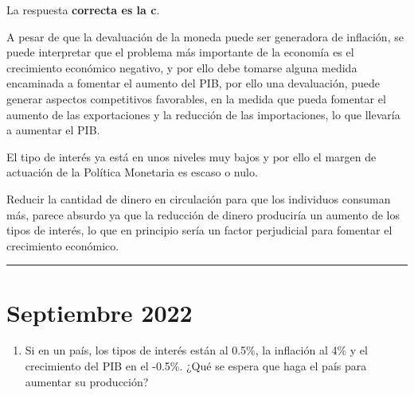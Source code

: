\documentclass[
  letterpaper,
  DIV=11,
  numbers=noendperiod]{scrreprt}
\providecommand{\tightlist}{%
  \setlength{\itemsep}{0pt}\setlength{\parskip}{0pt}}\usepackage{longtable,booktabs,array}
\begin{document}
\begin{tcolorbox}[enhanced jigsaw, left=2mm, opacityback=0, colback=white, breakable, arc=.35mm, bottomrule=.15mm, rightrule=.15mm, toprule=.15mm, leftrule=.75mm, colframe=quarto-callout-tip-color-frame]
\begin{minipage}[t]{5.5mm}
\textcolor{quarto-callout-tip-color}{\faLightbulb}
\end{minipage}%
\begin{minipage}[t]{\textwidth - 5.5mm}

La respuesta \textbf{correcta es la c}.

A pesar de que la devaluación de la moneda puede ser generadora de
inflación, se puede interpretar que el problema más importante de la
economía es el crecimiento económico negativo, y por ello debe tomarse
alguna medida encaminada a fomentar el aumento del PIB, por ello una
devaluación, puede generar aspectos competitivos favorables, en la
medida que pueda fomentar el aumento de las exportaciones y la reducción
de las importaciones, lo que llevaría a aumentar el PIB.

El tipo de interés ya está en unos niveles muy bajos y por ello el
margen de actuación de la Política Monetaria es escaso o nulo.

Reducir la cantidad de dinero en circulación para que los individuos
consuman más, parece absurdo ya que la reducción de dinero produciría un
aumento de los tipos de interés, lo que en principio sería un factor
perjudicial para fomentar el crecimiento económico.

\end{minipage}%
\end{tcolorbox}

\begin{center}\rule{0.5\linewidth}{0.5pt}\end{center}

\hypertarget{septiembre-2022}{%
\chapter*{Septiembre 2022}\label{septiembre-2022}}


\begin{enumerate}
\def\labelenumi{\arabic{enumi}.}
\tightlist
\item
  Si en un país, los tipos de interés están al 0.5\%, la inflación al
  4\% y el crecimiento del PIB en el -0.5\%. ¿Qué se espera que haga el
  país para aumentar su producción?
\end{enumerate}
\end{document}
